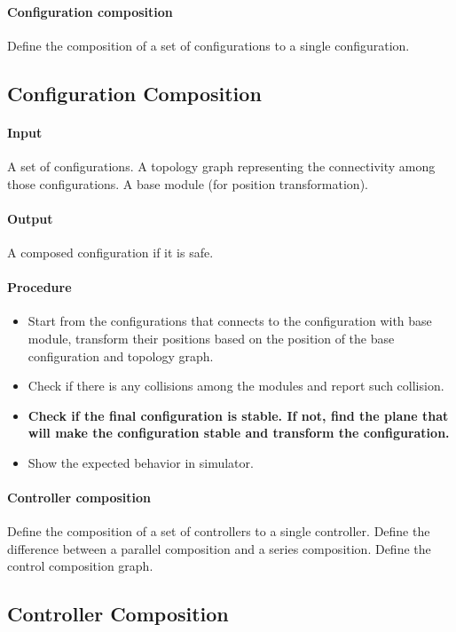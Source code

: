 \documentclass[12pt]{article}
\begin{document}
\paragraph{Configuration composition}
Define the composition of a set of configurations to a single configuration.

\subsection{Configuration Composition}
\paragraph{Input}
A set of configurations. A topology graph representing the connectivity among those configurations. A base module (for position transformation).
\paragraph{Output}
A composed configuration if it is safe.
\paragraph{Procedure}
\begin{itemize}
\item Start from the configurations that connects to the configuration with base module, transform their positions based on the position of the base configuration and topology graph.
\item Check if there is any collisions among the modules and report such collision.
\item \textbf{Check if the final configuration is stable. If not, find the plane that will make the configuration stable and transform the configuration.}
\item Show the expected behavior in simulator.
\end{itemize}

\paragraph{Controller composition}
Define the composition of a set of controllers to a single controller. Define the difference between a parallel composition and a series composition. Define the control composition graph.

\subsection{Controller Composition}
\end{document}
